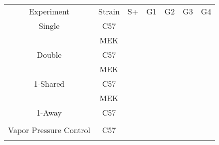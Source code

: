 

\begin{tabular}{ c c c c c c c }
    Experiment & Strain & S+ & G1 & G2 & G3 & G4 \\ 
    Single & C57 &  &  &  &  &   \\ 
     & MEK &  &  &  &  &  \\ 
    Double & C57 &  &  &  &  &    \\ 
     & MEK &  &  &  &  &   \\ 
    1-Shared & C57 &  &  &  &  &  \\ 
     & MEK &  &  &  &  &   \\ 
    1-Away & C57 &  &  &  &  &    \\ 
     &  & &  &  &  &  \\ 
    Vapor Pressure Control & C57 &  &  &  &  &   \\ 
    &  &  &  &  &  &   \\ 
\end{tabular}
